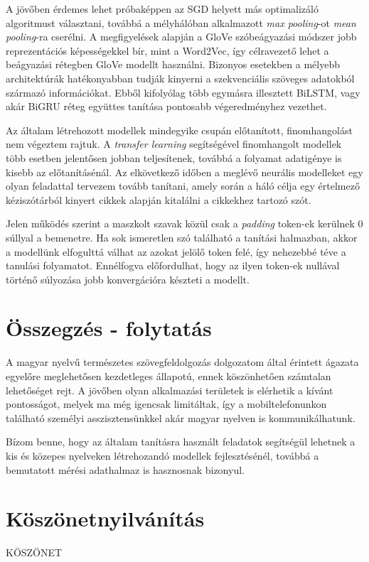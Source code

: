 A jövőben érdemes lehet próbaképpen az SGD helyett más optimalizáló algoritmust választani, továbbá a mélyhálóban alkalmazott \textit{max pooling}-ot \textit{mean pooling}-ra cserélni. A megfigyelések alapján a GloVe szóbeágyazási módszer jobb reprezentációs képességekkel bír, mint a Word2Vec, így célravezető lehet a beágyazási rétegben GloVe modellt használni. Bizonyos esetekben a mélyebb architektúrák hatékonyabban tudják kinyerni a szekvenciális szöveges adatokból származó információkat. Ebből kifolyólag több egymásra illesztett BiLSTM, vagy akár BiGRU réteg együttes tanítása pontosabb végeredményhez vezethet.

Az általam létrehozott modellek mindegyike csupán előtanított, finomhangolást nem végeztem rajtuk. A \textit{transfer learning} segítségével finomhangolt modellek több esetben jelentősen jobban teljesítenek, továbbá a folyamat adatigénye is kisebb az előtanításénál. Az elkövetkező időben a meglévő neurális modelleket egy olyan feladattal tervezem tovább tanítani, amely során a háló célja egy értelmező kéziszótárból kinyert cikkek alapján kitalálni a cikkekhez tartozó szót.

Jelen működés szerint a maszkolt szavak közül csak a \textit{padding} token-ek kerülnek 0 súllyal a bemenetre. Ha sok ismeretlen szó található a tanítási halmazban, akkor a modellünk elfogulttá válhat az azokat jelölő token felé, így nehezebbé téve a tanulási folyamatot. Ennélfogva előfordulhat, hogy az ilyen token-ek nullával történő súlyozása jobb konvergációra készteti a modellt.


\section*{Összegzés - folytatás}

A magyar nyelvű természetes szövegfeldolgozás dolgozatom által érintett ágazata egyelőre meglehetősen kezdetleges állapotú, ennek köszönhetően számtalan lehetőséget rejt. A jövőben olyan alkalmazási területek is elérhetik a kívánt pontosságot, melyek ma még igencsak limitáltak, így a mobiltelefonunkon található személyi asszisztensünkkel akár magyar nyelven is kommunikálhatunk.

Bízom benne, hogy az általam tanításra használt feladatok segítségül lehetnek a kis és közepes nyelveken létrehozandó modellek fejlesztésénél, továbbá a bemutatott mérési adathalmaz is hasznosnak bizonyul.



\section{Köszönetnyilvánítás}

KÖSZÖNET